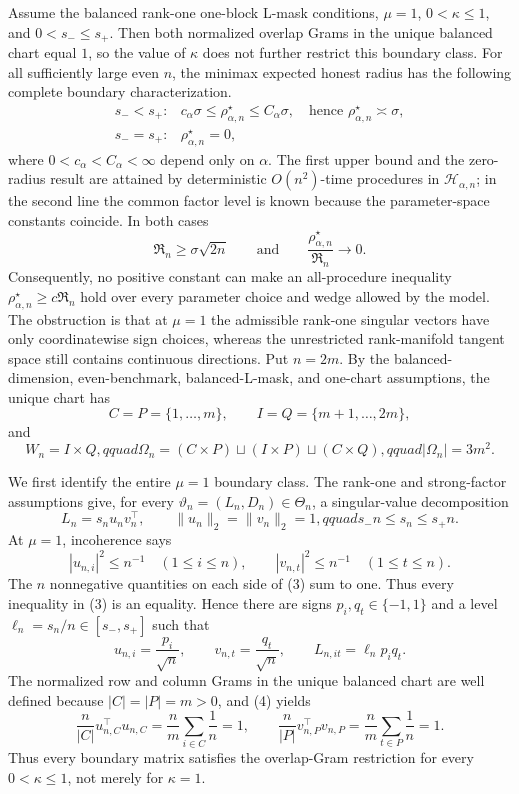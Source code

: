 Assume the balanced rank-one one-block L-mask conditions, \(\mu=1\), \(0<\kappa\le 1\), and \(0<s_-\le s_+\).  Then both normalized overlap Grams in the unique balanced chart equal \(1\), so the value of \(\kappa\) does not further restrict this boundary class.  For all sufficiently large even \(n\), the minimax expected honest radius has the following complete boundary characterization.
\[
\begin{array}{ll}
s_-<s_+:& c_\alpha\sigma\le \rho_{\alpha,n}^{\star}\le C_\alpha\sigma,
\quad\text{hence }\rho_{\alpha,n}^{\star}\asymp\sigma,\\[3pt]
s_-=s_+:& \rho_{\alpha,n}^{\star}=0,
\end{array}
\]
where \(0<c_\alpha<C_\alpha<\infty\) depend only on \(\alpha\).  The first upper bound and the zero-radius result are attained by deterministic \(O(n^2)\)-time procedures in \(\mathcal H_{\alpha,n}\); in the second line the common factor level is known because the parameter-space constants coincide.  In both cases
\[
\mathfrak R_n\ge \sigma\sqrt{2n}
\qquad\text{and}\qquad
\frac{\rho_{\alpha,n}^{\star}}{\mathfrak R_n}\longrightarrow0.
\]
Consequently, no positive constant can make an all-procedure inequality \(\rho_{\alpha,n}^{\star}\ge c\mathfrak R_n\) hold over every parameter choice and wedge allowed by the model.  The obstruction is that at \(\mu=1\) the admissible rank-one singular vectors have only coordinatewise sign choices, whereas the unrestricted rank-manifold tangent space still contains continuous directions.
Put \(n=2m\).  By the balanced-dimension, even-benchmark, balanced-L-mask, and one-chart assumptions, the unique chart has
\[
C=P=\{1,\ldots,m\},\qquad I=Q=\{m+1,\ldots,2m\},
\]
and
\[
W_n=I\times Q,qquad
\Omega_n=(C\times P)\mathbin{\sqcup}(I\times P)
\mathbin{\sqcup}(C\times Q),qquad |\Omega_n|=3m^2.       \tag{1}
\]

We first identify the entire \(\mu=1\) boundary class.  The rank-one and strong-factor assumptions give, for every \(\vartheta_n=(L_n,D_n)\in\Theta_n\), a singular-value decomposition
\[
L_n=s_nu_nv_n^{\top},\qquad
\lVert u_n\rVert_2=\lVert v_n\rVert_2=1,qquad
s_-n\le s_n\le s_+n.                                      \tag{2}
\]
At \(\mu=1\), incoherence says
\[
|u_{n,i}|^2\le n^{-1}\quad(1\le i\le n),
\qquad |v_{n,t}|^2\le n^{-1}\quad(1\le t\le n).          \tag{3}
\]
The \(n\) nonnegative quantities on each side of (3) sum to one.  Thus every inequality in (3) is an equality.  Hence there are signs \(p_i,q_t\in\{-1,1\}\) and a level
\(\ell_n=s_n/n\in[s_-,s_+]\) such that
\[
u_{n,i}=\frac{p_i}{\sqrt n},\qquad
v_{n,t}=\frac{q_t}{\sqrt n},\qquad
L_{n,it}=\ell_np_iq_t.                                    \tag{4}
\]
The normalized row and column Grams in the unique balanced chart are well defined because \(|C|=|P|=m>0\), and (4) yields
\[
\frac{n}{|C|}u_{n,C}^{\top}u_{n,C}
=\frac{n}{m}\sum_{i\in C}\frac1n=1,
\qquad
\frac{n}{|P|}v_{n,P}^{\top}v_{n,P}
=\frac{n}{m}\sum_{t\in P}\frac1n=1.                     \tag{5}
\]
Thus every boundary matrix satisfies the overlap-Gram restriction for every \(0<\kappa\le1\), not merely for \(\kappa=1\).

